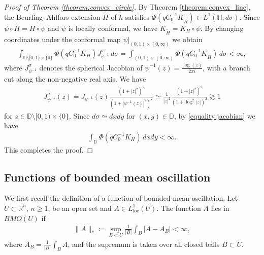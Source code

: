 \documentclass{amsart}
\theoremstyle{plain}
\theoremstyle{definition}
\theoremstyle{remark}
\numberwithin{equation}{section}
\numberwithin{theorem}{section}
\numberwithin{conjecture}{section}
\newcommand{\R}{\mathbb R}
\newcommand{\D}{\mathbb D}
\newcommand{\1}{\mathbf 1}
\newcommand{\UHP}{\mathbb H}
\DeclareMathOperator{\loc}{\mathrm{loc}}
\begin{document}
\begin{proof}[Proof of Theorem \ref{theorem:convex_circle}]
By Theorem \ref{theorem:convex_line}, the Beurling--Ahlfors extension $\widetilde H$ of $\widetilde h$ satisfies $\Phi(qC_0^{-1}K_{\widetilde H})  \in L^1( \UHP; d\sigma)$. Since $\psi \circ \widetilde H= H\circ \psi$ and $\psi$ is locally conformal, we have $K_{\widetilde H}= K_H \circ \psi$. By changing coordinates under the conformal map $\psi|_{(0,1)\times (0,\infty)}$ we obtain
\begin{align}\label{equality:jacobian}
\int_{\D \setminus [0,1)\times \{0\}} \Phi(qC_0^{-1}K_{H}) J_{\psi^{-1}}^{\sigma}\, d\sigma =\int_{(0,1)\times (0,\infty)}  \Phi(qC_0^{-1}K_{\widetilde H}) \, d\sigma<\infty,
\end{align}
where $J_{\psi^{-1}}^{\sigma}$ denotes the spherical Jacobian  of $\psi^{-1}(z)= \frac{\log(z)}{2\pi i}$, with a branch cut along the non-negative real axis. We have
\begin{align*}
J_{\psi^{-1}}^{\sigma}(z)= J_{\psi^{-1}}(z) \frac{(1+|z|^2)^2}{(1+|\psi^{-1}(z)|^2)^2}\simeq \frac{1}{|z|^2}\frac{(1+|z|^2)^2}{(1+\log^2|z|)^2} \gtrsim 1
\end{align*}
for $z\in \D\setminus[0,1)\times \{0\}$. Since $d\sigma\simeq dxdy$ for $(x,y)\in \D$, by \eqref{equality:jacobian} we have
\begin{align*}
\int_{\D} \Phi(qC_0^{-1}K_{H})\, dxdy <\infty.
\end{align*}
This completes the proof.
\end{proof}

\bigskip

\subsection{Functions of bounded mean oscillation}\label{section:bmo}
We first recall the definition of a function of bounded mean oscillation. Let $U\subset \R^n$, $n\geq 1$, be an open set and $A\in L^1_{\loc}(U)$. The function $A$ lies in $BMO(U)$ if 
\begin{align*}
\|A\|_*\coloneqq \sup_{B\subset U} \frac{1}{|B|} \int_B |A-A_B| <\infty,
\end{align*}
where $A_B= \frac{1}{|B|}\int_B A$,  and the supremum is taken over all closed balls $B\subset U$.
\end{document}
